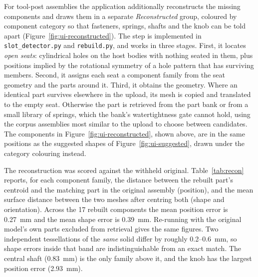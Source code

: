 \documentclass[12pt,oneside,a4paper]{report}
\begin{document}
For tool-post assemblies the application additionally reconstructs the missing
components and draws them in a separate \emph{Reconstructed} group, coloured by
component category so that fasteners, springs, shafts and the knob can be told
apart (Figure~\ref{fig:ui-reconstructed}). The step is implemented in
\texttt{slot\_detector.py} and \texttt{rebuild.py}, and works in three stages.
First, it locates \emph{open seats}: cylindrical holes on the host bodies with
nothing seated in them, plus positions implied by the rotational symmetry of a
hole pattern that has surviving members. Second, it assigns each seat a
component family from the seat geometry and the parts around it. Third, it
obtains the geometry. Where an identical part survives elsewhere in the upload,
its mesh is copied and translated to the empty seat. Otherwise the part is
retrieved from the part bank or from a small library of springs, which the
bank's watertightness gate cannot hold, using the corpus assemblies most
similar to the upload to choose between candidates. The components in
Figure~\ref{fig:ui-reconstructed}, shown above, are in the same positions as the
suggested shapes of Figure~\ref{fig:ui-suggested}, drawn under the category
colouring instead.


The reconstruction was scored against the withheld original. Table~\ref{tab:recon}
reports, for each component family, the distance between the rebuilt part's
centroid and the matching part in the original assembly (position), and the
mean surface distance between the two meshes after centring both (shape and
orientation). Across the 17 rebuilt components the mean position error is
0.27~mm and the mean shape error is 0.39~mm. Re-running with the original
model's own parts excluded from retrieval gives the same figures. Two
independent tessellations of the \emph{same} solid differ by roughly
0.2--0.6~mm, so shape errors inside that band are indistinguishable from an
exact match. The central shaft (0.83~mm) is the only family above it, and the
knob has the largest position error (2.93~mm).
\end{document}
